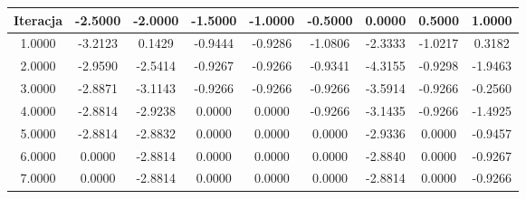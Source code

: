 \documentclass[a4paper, 11pt]{article}
\begin{document}
\begin{enumerate}
\begin{itemize}
\begin{table}
\label{table:Wyniki dla algorytmu Newtona}                                                                                                                                                                                        
\end{table}                                                                                                                                                                                                      \begin{table}                                                                            
\centering                                                                               
\begin{tabular}{|c|c|c|c|c|c|c|c|c|}                                                     
\hline                                                                                   
Iteracja & -2.5000 & -2.0000 & -1.5000 & -1.0000 & -0.5000 & 0.0000 & 0.5000 & 1.0000 \\   
\hline                                                                                   
1.0000 & -3.2123 & 0.1429 & -0.9444 & -0.9286 & -1.0806 & -2.3333 & -1.0217 & 0.3182 \\  
\hline                                                                                   
2.0000 & -2.9590 & -2.5414 & -0.9267 & -0.9266 & -0.9341 & -4.3155 & -0.9298 & -1.9463 \\
\hline                                                                                   
3.0000 & -2.8871 & -3.1143 & -0.9266 & -0.9266 & -0.9266 & -3.5914 & -0.9266 & -0.2560 \\
\hline                                                                                   
4.0000 & -2.8814 & -2.9238 & 0.0000 & 0.0000 & -0.9266 & -3.1435 & -0.9266 & -1.4925 \\  
\hline                                                                                   
5.0000 & -2.8814 & -2.8832 & 0.0000 & 0.0000 & 0.0000 & -2.9336 & 0.0000 & -0.9457 \\    
\hline                                                                                   
6.0000 & 0.0000 & -2.8814 & 0.0000 & 0.0000 & 0.0000 & -2.8840 & 0.0000 & -0.9267 \\     
\hline                                                                                   
7.0000 & 0.0000 & -2.8814 & 0.0000 & 0.0000 & 0.0000 & -2.8814 & 0.0000 & -0.9266 \\     
\hline                                                                                   

\end{tabular}
\end{table}
\end{itemize}
\end{enumerate}
\end{document}
